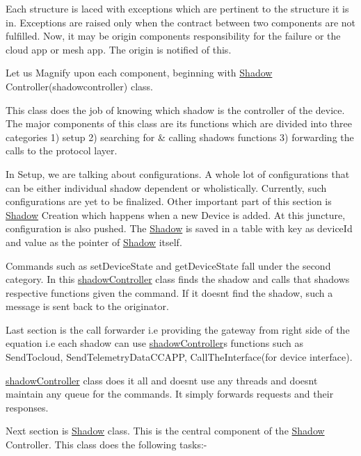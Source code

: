 Each structure is laced with exceptions which are pertinent to the structure it is in. Exceptions are raised only when the contract between two components are not fulfilled. Now, it may be origin components\textquotesingle{} responsibility for the failure or the cloud app or mesh app. The origin is notified of this.

Let us Magnify upon each component, beginning with \hyperlink{classShadow}{Shadow} Controller(shadowcontroller) class.

This class does the job of knowing which shadow is the controller of the device. The major components of this class are its functions which are divided into three categories 1) setup 2) searching for \& calling shadow\textquotesingle{}s functions 3) forwarding the calls to the protocol layer.

In Setup, we are talking about configurations. A whole lot of configurations that can be either individual shadow dependent or wholistically. Currently, such configurations are yet to be finalized. Other important part of this section is \hyperlink{classShadow}{Shadow} Creation which happens when a new Device is added. At this juncture, configuration is also pushed. The \hyperlink{classShadow}{Shadow} is saved in a table with key as device\+Id and value as the pointer of \hyperlink{classShadow}{Shadow} itself.

Commands such as set\+Device\+State and get\+Device\+State fall under the second category. In this \hyperlink{classshadowController}{shadow\+Controller} class finds the shadow and calls that shadow\textquotesingle{}s respective functions given the command. If it doesn\textquotesingle{}t find the shadow, such a message is sent back to the originator.

Last section is the call forwarder i.\+e providing the gateway from right side of the equation i.\+e each shadow can use \hyperlink{classshadowController}{shadow\+Controller}\textquotesingle{}s functions such as Send\+Tocloud, Send\+Telemetry\+Data\+C\+C\+A\+PP, Call\+The\+Interface(for device interface).

\hyperlink{classshadowController}{shadow\+Controller} class does it all and doesn\textquotesingle{}t use any threads and doesn\textquotesingle{}t maintain any queue for the commands. It simply forwards requests and their responses. 



Next section is \hyperlink{classShadow}{Shadow} class. This is the central component of the \hyperlink{classShadow}{Shadow} Controller. This class does the following tasks\+:-\/

